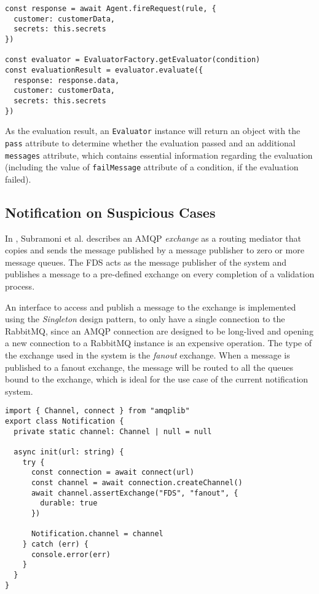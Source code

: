       \begin{lstlisting}[style=es6, caption={EvaluatorFactory usage in ValidationEngine class (TypeScript)}]
const response = await Agent.fireRequest(rule, {
  customer: customerData,
  secrets: this.secrets
})

const evaluator = EvaluatorFactory.getEvaluator(condition)
const evaluationResult = evaluator.evaluate({
  response: response.data,
  customer: customerData,
  secrets: this.secrets
})
\end{lstlisting}

      As the evaluation result, an \verb;Evaluator; instance will return an object with the \verb;pass; attribute to determine whether the evaluation passed and an additional \verb;messages; attribute, which contains essential information regarding the evaluation (including the value of \verb;failMessage; attribute of a condition, if the evaluation failed). 

  \subsection{Notification on Suspicious Cases}
      
    In \autocite{amqp}, Subramoni et al. describes an AMQP \emph{exchange} as a routing mediator that copies and sends the message published by a message publisher to zero or more message queues. The FDS acts as the message publisher of the system and publishes a message to a pre-defined exchange on every completion of a validation process. 
    
    An interface to access and publish a message to the exchange is implemented using the \emph{Singleton} \autocite[pp. 127-134]{gamma-1995} design pattern, to only have a single connection to the RabbitMQ, since an AMQP connection are designed to be long-lived and opening a new connection to a RabbitMQ instance is an expensive operation. The type of the exchange used in the system is the \emph{fanout} exchange. When a message is published to a fanout exchange, the message will be routed to all the queues bound to the exchange, which is ideal for the use case of the current notification system. 

    \begin{lstlisting}[style=es6, caption={Openning a connection to RabbitMQ instance (TypeScript)}]
import { Channel, connect } from "amqplib"
export class Notification {
  private static channel: Channel | null = null

  async init(url: string) {
    try {
      const connection = await connect(url)
      const channel = await connection.createChannel() 
      await channel.assertExchange("FDS", "fanout", {
        durable: true 
      }) 

      Notification.channel = channel
    } catch (err) {
      console.error(err)
    }
  }
}
\end{lstlisting}
    
